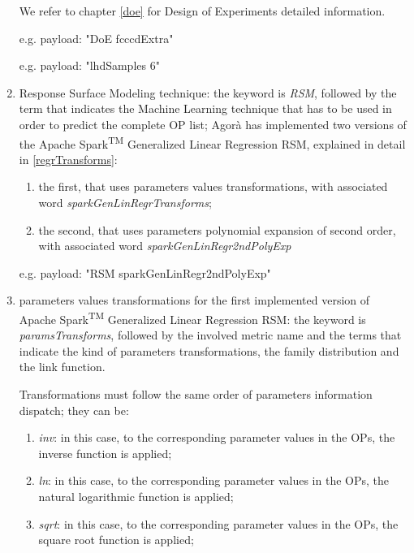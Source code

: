 \begin{enumerate}
    We refer to chapter \ref{doe} for Design of Experiments detailed information.
    
    e.g. payload: "DoE fcccdExtra"
    
    e.g. payload: "lhdSamples 6"
    
    \item Response Surface Modeling technique: the keyword is \textit{RSM}, followed by the term that indicates the Machine Learning technique that has to be used in order to predict the complete OP list; Agorà has implemented two versions of the Apache Spark\textsuperscript{TM} Generalized Linear Regression RSM, explained in detail in \ref{regrTransforms}:
    
    \begin{enumerate}
    
        \item the first, that uses parameters values transformations, with associated word \textit{sparkGenLinRegrTransforms};
        
        \item the second, that uses parameters polynomial expansion of second order, with associated word \textit{sparkGenLinRegr2ndPolyExp}
    
    \end{enumerate}
    
    e.g. payload: "RSM sparkGenLinRegr2ndPolyExp"
    
    \item parameters values transformations for the first implemented version of Apache Spark\textsuperscript{TM} Generalized Linear Regression RSM: the keyword is \textit{paramsTransforms}, followed by the involved metric name and the terms that indicate the kind of parameters transformations, the family distribution and the link function.
    
    Transformations must follow the same order of parameters information dispatch; they can be:
    
    \begin{enumerate}
    
        \item \textit{inv}: in this case, to the corresponding parameter values in the OPs, the inverse function is applied;
        
        \item \textit{ln}: in this case, to the corresponding parameter values in the OPs, the natural logarithmic function is applied;
        
        \item \textit{sqrt}: in this case, to the corresponding parameter values in the OPs, the square root function is applied;
        

\end{enumerate}
\end{enumerate}
